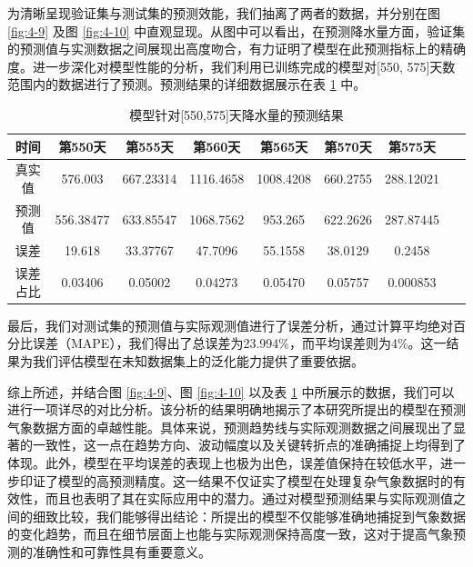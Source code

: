 为清晰呈现验证集与测试集的预测效能，我们抽离了两者的数据，并分别在图 \ref{fig:4-9} 及图 \ref{fig:4-10} 中直观显现。从图中可以看出，在预测降水量方面，验证集的预测值与实测数据之间展现出高度吻合，有力证明了模型在此预测指标上的精确度。进一步深化对模型性能的分析，我们利用已训练完成的模型对[550, 575]天数范围内的数据进行了预测。预测结果的详细数据展示在表 \ref{tab:LSTM_data——pre} 中。


\begin{table}[h]
    \caption{模型针对[550,575]天降水量的预测结果}\label{tab:LSTM_data——pre}
    \centering
    \resizebox{1.0\linewidth}{!}
    {\begin{tabular}{*8{c}}\toprule
        时间 & 第550天 & 第555天 & 第560天 & 第565天 & 第570天 & 第575天 & ~ \\ 
        \midrule
        真实值 & 576.003 & 667.23314 & 1116.4658 & 1008.4208 & 660.2755 & 288.12021 \\ 
        预测值 & 556.38477 & 633.85547 & 1068.7562 & 953.265 & 622.2626 & 287.87445 \\ 
        误差 & 19.618 & 33.37767 & 47.7096 & 55.1558 & 38.0129 & 0.2458 \\ 
        误差占比 & 0.03406 & 0.05002 & 0.04273 & 0.05470 & 0.05757 & 0.000853 \\ 
        \bottomrule
    \end{tabular}}
\end{table}

最后，我们对测试集的预测值与实际观测值进行了误差分析，通过计算平均绝对百分比误差（MAPE），我们得出了总误差为23.994\%，而平均误差则为4\%。这一结果为我们评估模型在未知数据集上的泛化能力提供了重要依据。



综上所述，并结合图 \ref{fig:4-9}、图 \ref{fig:4-10} 以及表 \ref{tab:LSTM_data——pre} 中所展示的数据，我们可以进行一项详尽的对比分析。该分析的结果明确地揭示了本研究所提出的模型在预测气象数据方面的卓越性能。具体来说，预测趋势线与实际观测数据之间展现出了显著的一致性，这一点在趋势方向、波动幅度以及关键转折点的准确捕捉上均得到了体现。此外，模型在平均误差的表现上也极为出色，误差值保持在较低水平，进一步印证了模型的高预测精度。这一结果不仅证实了模型在处理复杂气象数据时的有效性，而且也表明了其在实际应用中的潜力。通过对模型预测结果与实际观测值之间的细致比较，我们能够得出结论：所提出的模型不仅能够准确地捕捉到气象数据的变化趋势，而且在细节层面上也能与实际观测保持高度一致，这对于提高气象预测的准确性和可靠性具有重要意义。

